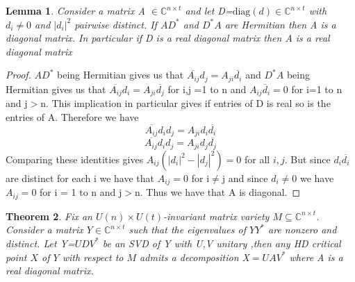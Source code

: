 \documentclass[11pt]{amsart}
\def\C{\mathbb C}\let\ce\C
\theoremstyle{plain}
\newtheorem{theorem}{Theorem}
\newtheorem{lemma}[theorem]{Lemma}
\theoremstyle{definition}
\theoremstyle{remark}
\begin{document}
   
   \begin{lemma} \label{RD}
       Consider a matrix A $\in \mathbb{C}^{n \times t}$ and let D=$\mathrm{diag}(d)\in\C^{n\times t}$ with $d_i\neq 0$ and $|d_i|^2$ pairwise distinct. If $AD^*$ and $D^*A$ are Hermitian then A is a diagonal matrix. In particular if D is a real diagonal matrix then A is a real diagonal matrix
   \end{lemma}
\begin{proof}
    $AD^*$ being Hermitian gives us that $\overline{A_{ij}}d_j=A_{ji}\overline{d_i}$ and $D^*A$ being Hermitian gives us that $\overline{A_{ij}}d_i=A_{ji}\overline{d_j}$ for i,j =1 to n and $A_{ij}\overline{d}_i=0$ for i=1 to n and j$>$n. This implication in particular gives if entries of D is real so is the entries of A. Therefore we have $$\overline{A_{ij}}d_id_j=A_{ji}d_i \overline{d_i}$$ $$\overline{A_{ij}}d_id_j=A_{ji}d_j \overline{d_j}$$ Comparing these identities gives
$A_{ij}(|d_i|^2-|d_j|^2)=0$ for all $i,j$. But since $d_i \overline{d_i}$ are distinct for each i we have that $A_{ij}=0$ for i$\neq$j and since $d_i \neq 0$ we have $A_{ij}=0$ for i = 1 to n and j$>$n. Thus we have that A is diagonal.
\end{proof}
\begin{theorem}\label{sim}
    Fix an $U(n) \times U(t)$-invariant matrix variety $M \subseteq \mathbb{C}^{n \times t}$. Consider a matrix $Y \in \mathbb{C}^{n \times t}$ such that the eigenvalues of $Y Y^*$ are nonzero and distinct. Let Y=$UDV^*$ be an SVD of Y with U,V unitary ,then any HD critical point $X$ of $Y$ with respect to $M$ admits a decomposition X$=UAV^*$ where A is a real diagonal matrix.
\end{theorem}
\end{document}
